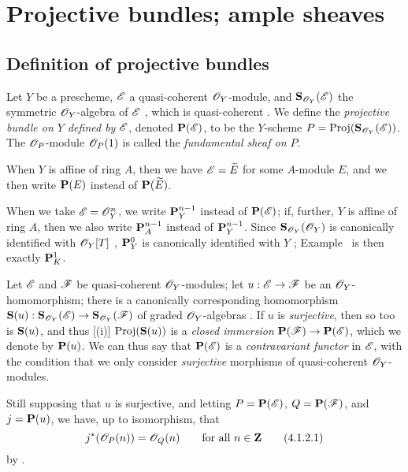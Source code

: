 \section{Projective bundles; ample sheaves}
\label{section:II.4}


\subsection{Definition of projective bundles}
\label{subsection:II.4.1}

\begin{definition}[4.1.1]
\label{II.4.1.1}
Let $Y$ be a prescheme, $\mathscr{E}$ a quasi-coherent $\mathscr{O}_Y$-module, and $\mathbf{S}_{\mathscr{O}_Y}(\mathscr{E})$ the symmetric $\mathscr{O}_Y$-algebra of $\mathscr{E}$ , which is quasi-coherent .
We define the \emph{projective bundle on $Y$ defined by $\mathscr{E}$}, denoted $\mathbf{P}(\mathscr{E})$, to be the $Y$-scheme $P=\operatorname{Proj}(\mathbf{S}_{\mathscr{O}_Y}(\mathscr{E}))$.
The $\mathscr{O}_P$-module $\mathscr{O}_P(1)$ is called the \emph{fundamental sheaf on $P$}.
\end{definition}

When $Y$ is affine of ring $A$, then we have $\mathscr{E}=\widetilde{E}$ for some $A$-module $E$, and we then write $\mathbf{P}(E)$ instead of $\mathbf{P}(\widetilde{E})$.

When we take $\mathscr{E}=\mathscr{O}_Y^n$, we write $\mathbf{P}_Y^{n-1}$ instead of $\mathbf{P}(\mathscr{E})$;
if, further, $Y$ is affine of ring $A$, then we also write $\mathbf{P}_A^{n-1}$ instead of $\mathbf{P}_Y^{n-1}$.
Since $\mathbf{S}_{\mathscr{O}_Y}(\mathscr{O}_Y)$ is canonically identified with $\mathscr{O}_Y[T]$ , $\mathbf{P}_Y^0$ is canonically identified with $Y$ ;
Example~ is then exactly $\mathbf{P}_K^1$.

\begin{env}[4.1.2]
\label{II.4.1.2}
Let $\mathscr{E}$ and $\mathscr{F}$ be quasi-coherent $\mathscr{O}_Y$-modules;
let $u:\sh{E}\to\sh{F}$ be an $\mathscr{O}_Y$-homomorphism;
there is a canonically corresponding homomorphism $\bb{S}(u):\bb{S}_{\sh{O}_Y}(\sh{E})\to\bb{S}_{\sh{O}_Y}(\sh{F})$ of graded $\mathscr{O}_Y$-algebras .
If $u$ is \emph{surjective}, then so too is $\mathbf{S}(u)$, and thus [(i)] $\operatorname{Proj}(\mathbf{S}(u))$ is a \emph{closed immersion} $\bb{P}(\sh{F})\to\bb{P}(\sh{E})$, which we denote by $\mathbf{P}(u)$.
We can thus say that $\mathbf{P}(\mathscr{E})$ is a \emph{contravariant functor} in $\mathscr{E}$, with the condition that we only consider \emph{surjective} morphisms of quasi-coherent $\mathscr{O}_Y$-modules.

Still supposing that $u$ is surjective, and letting $P=\mathbf{P}(\mathscr{E})$, $Q=\mathbf{P}(\mathscr{F})$, and $j=\mathbf{P}(u)$, we have, up to isomorphism, that
\[
\label{II.4.1.2.1}
  j^*(\mathscr{O}_P(n)) = \mathscr{O}_Q(n)
  \qquad\mbox{for all $n\in\mathbf{Z}$}
  \tag{4.1.2.1}
\]
by .
\end{env}

